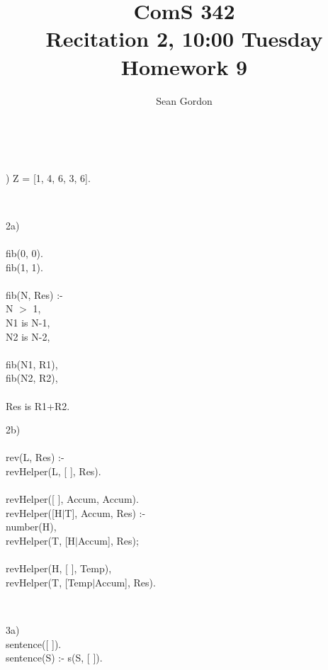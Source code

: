 \documentclass[12pt]{article}
\title{ComS 342\\Recitation 2, 10:00 Tuesday\\Homework 9}
\author{Sean Gordon}
\begin{document}
\maketitle


\hrulefill \\


\begin{center}
) Z = [1, 4, 6, 3, 6].
\end{center}


\hrulefill \\


\begin{multicols}{2}

\noindent 2a)\\\\
fib(0, 0).\\
fib(1, 1).\\\\
fib(N, Res) :-\\
\indent N $>$ 1,\\
\indent N1 is N-1,\\
\indent N2 is N-2,\\\\
\indent fib(N1, R1),\\
\indent fib(N2, R2),\\\\
\indent Res is R1+R2.\\

\columnbreak

\noindent 2b)\\\\
rev(L, Res) :-\\
\indent revHelper(L, [ ], Res).\\\\
revHelper([ ], Accum, Accum).\\
revHelper([H$|$T], Accum, Res) :-\\
\indent number(H),\\
\indent revHelper(T, [H$|$Accum], Res);\\\\
\indent revHelper(H, [ ], Temp),\\
\indent revHelper(T, [Temp$|$Accum], Res).\\

\end{multicols} 


\hrulefill \\
\pagebreak


\noindent 3a)\\
sentence([ ]).\\
sentence(S) :- s(S, [ ]).\\
\end{document}
